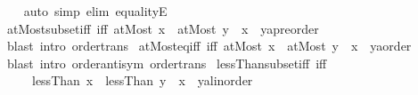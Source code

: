 \begin{isabellebody}
%
\isadelimproof
\ \ %
\endisadelimproof
%
\isatagproof
{}\isamarkupfalse%
\ {\isacharparenleft}{\kern0pt}auto\ simp{\isacharcolon}{\kern0pt}\ elim{\isacharbang}{\kern0pt}{\isacharcolon}{\kern0pt}\ equalityE{\isacharparenright}{\kern0pt}%
\endisatagproof
{\isafoldproof}%
%
\isadelimproof
\isanewline
%
\endisadelimproof
\isanewline
{}\isamarkupfalse%
\ atMost{\isacharunderscore}{\kern0pt}subset{\isacharunderscore}{\kern0pt}iff\ {\isacharbrackleft}{\kern0pt}iff{\isacharbrackright}{\kern0pt}{\isacharcolon}{\kern0pt}\ {\isachardoublequoteopen}{\isacharparenleft}{\kern0pt}atMost\ x\ {\isasymsubseteq}\ atMost\ y{\isacharparenright}{\kern0pt}\ {\isacharequal}{\kern0pt}\ {\isacharparenleft}{\kern0pt}x\ {\isasymle}\ {\isacharparenleft}{\kern0pt}y{\isacharcolon}{\kern0pt}{\isacharcolon}{\kern0pt}{\isacharprime}{\kern0pt}a{\isacharcolon}{\kern0pt}{\isacharcolon}{\kern0pt}preorder{\isacharparenright}{\kern0pt}{\isacharparenright}{\kern0pt}{\isachardoublequoteclose}\isanewline
%
\isadelimproof
\ \ %
\endisadelimproof
%
\isatagproof
{}\isamarkupfalse%
\ {\isacharparenleft}{\kern0pt}blast\ intro{\isacharcolon}{\kern0pt}\ order{\isacharunderscore}{\kern0pt}trans{\isacharparenright}{\kern0pt}%
\endisatagproof
{\isafoldproof}%
%
\isadelimproof
\isanewline
%
\endisadelimproof
\isanewline
{}\isamarkupfalse%
\ atMost{\isacharunderscore}{\kern0pt}eq{\isacharunderscore}{\kern0pt}iff\ {\isacharbrackleft}{\kern0pt}iff{\isacharbrackright}{\kern0pt}{\isacharcolon}{\kern0pt}\ {\isachardoublequoteopen}{\isacharparenleft}{\kern0pt}atMost\ x\ {\isacharequal}{\kern0pt}\ atMost\ y{\isacharparenright}{\kern0pt}\ {\isacharequal}{\kern0pt}\ {\isacharparenleft}{\kern0pt}x\ {\isacharequal}{\kern0pt}\ {\isacharparenleft}{\kern0pt}y{\isacharcolon}{\kern0pt}{\isacharcolon}{\kern0pt}{\isacharprime}{\kern0pt}a{\isacharcolon}{\kern0pt}{\isacharcolon}{\kern0pt}order{\isacharparenright}{\kern0pt}{\isacharparenright}{\kern0pt}{\isachardoublequoteclose}\isanewline
%
\isadelimproof
\ \ %
\endisadelimproof
%
\isatagproof
{}\isamarkupfalse%
\ {\isacharparenleft}{\kern0pt}blast\ intro{\isacharcolon}{\kern0pt}\ order{\isacharunderscore}{\kern0pt}antisym\ order{\isacharunderscore}{\kern0pt}trans{\isacharparenright}{\kern0pt}%
\endisatagproof
{\isafoldproof}%
%
\isadelimproof
\isanewline
%
\endisadelimproof
\isanewline
{}\isamarkupfalse%
\ lessThan{\isacharunderscore}{\kern0pt}subset{\isacharunderscore}{\kern0pt}iff\ {\isacharbrackleft}{\kern0pt}iff{\isacharbrackright}{\kern0pt}{\isacharcolon}{\kern0pt}\isanewline
\ \ \ \ \ {\isachardoublequoteopen}{\isacharparenleft}{\kern0pt}lessThan\ x\ {\isasymsubseteq}\ lessThan\ y{\isacharparenright}{\kern0pt}\ {\isacharequal}{\kern0pt}\ {\isacharparenleft}{\kern0pt}x\ {\isasymle}\ {\isacharparenleft}{\kern0pt}y{\isacharcolon}{\kern0pt}{\isacharcolon}{\kern0pt}{\isacharprime}{\kern0pt}a{\isacharcolon}{\kern0pt}{\isacharcolon}{\kern0pt}linorder{\isacharparenright}{\kern0pt}{\isacharparenright}{\kern0pt}{\isachardoublequoteclose}\isanewline

\end{isabellebody}
